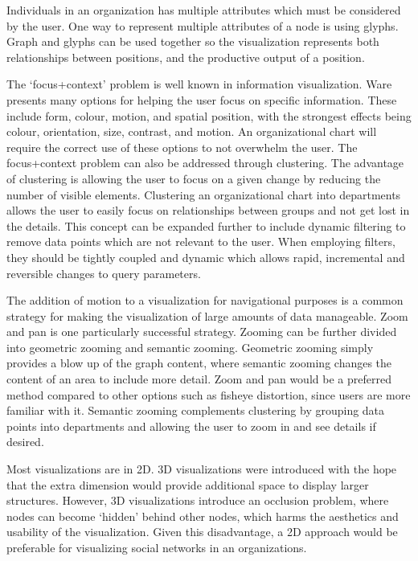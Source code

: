 \documentclass[12pt,letterpaper]{article}
\begin{document}
Individuals in an organization has multiple attributes which must be considered by the user. One way to represent multiple attributes of a node is using glyphs\cite[chapter 5]{ware2012information}.  Graph and glyphs can be used together so the visualization represents both relationships between positions, and the productive output of a position.

The \lq focus+context\rq{} problem is well known in information visualization.  Ware\cite{ware2012information} presents many options for helping the user focus on specific information.  These include form, colour, motion, and spatial position, with the strongest effects being colour, orientation, size, contrast, and motion\cite[chapter 5]{ware2012information}.  An organizational chart will require the correct use of these options to not overwhelm the user.  The focus+context problem can also be addressed through clustering.  The advantage of clustering is allowing the user to focus on a given change by reducing the number of visible elements\cite{herman2000graph}.  Clustering an organizational chart into departments allows the user to easily focus on relationships between groups and not get lost in the details.  This concept can be expanded further to include dynamic filtering to remove data points which are not relevant to the user.  When employing filters, they should be tightly coupled and dynamic which allows rapid, incremental and reversible changes to query parameters\cite{ahlberg1994visual}.

The addition of motion to a visualization for navigational purposes is a common strategy for making the visualization of large amounts of data manageable. Zoom and pan is one particularly successful strategy. Zooming can be further divided into geometric zooming and semantic zooming.  Geometric zooming simply provides a blow up of the graph content, where semantic zooming changes the content of an area to include more detail\cite{herman2000graph}. Zoom and pan would be a preferred method compared to other options such as fisheye distortion, since users are more familiar with it. Semantic zooming complements clustering by grouping data points into departments and allowing the user to zoom in and see details if desired.

Most visualizations are in 2D. 3D visualizations were introduced with the hope that the extra dimension would provide additional space to display larger structures\cite{herman2000graph}. However, 3D visualizations introduce an occlusion problem, where nodes can become \lq hidden\rq{} behind other nodes, which harms the aesthetics and usability of the visualization\cite{herman2000graph}. Given this disadvantage, a 2D approach would be preferable for visualizing social networks in an organizations.
\end{document}
